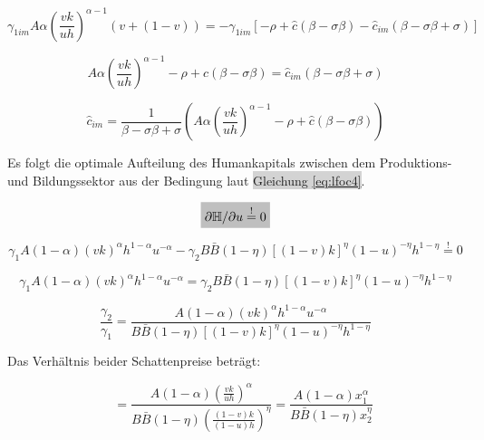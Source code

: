 	\begin{equation*}
		\gamma_{1im} A \alpha \left(\frac{vk}{uh}\right)^{\alpha -1} (v+(1-v)) = - \gamma_{1im} \left [ - \rho + \hat{c} (\beta - \sigma\beta) - \hat{c}_{im} (\beta-\sigma\beta+ \sigma) \right ]
	\end{equation*}


	\begin{equation*}
		A \alpha \left(\frac{vk}{uh}\right)^{\alpha -1} - \rho + \hat{c} (\beta - \sigma\beta) = \hat{c}_{im}(\beta-\sigma\beta+ \sigma)
	\end{equation*}


	\begin{equation}
		\boxed{\hat{c}_{im}=\frac{1}{\beta-\sigma\beta+ \sigma}\left(A\alpha \left(\frac{vk}{uh}\right)^{\alpha -1}-\rho+\hat{c}(\beta - \sigma\beta)\right)}\label{eq:lKRRim}
	\end{equation}


Es folgt die optimale Aufteilung des Humankapitals zwischen dem Produktions- und Bildungssektor aus der Bedingung laut \colorbox{lightgray}{Gleichung \eqref{eq:lfoc4}}.


	\begin{equation*}
		\colorbox{lightgray}{$\partial\mathbb{H}/\partial u\overset{!}{=}0$}
	\end{equation*}


	\begin{equation}
		\gamma_1A(1-\alpha)(vk)^{\alpha}h^{1-\alpha}u^{-\alpha}-\gamma_2B\bar{B}(1-\eta)[(1-v)k]^\eta (1-u)^{-\eta} h^{1-\eta}\overset{!}{=}0
	\end{equation}

	
	\begin{equation}
		\gamma_1A(1-\alpha)(vk)^{\alpha}h^{1-\alpha}u^{-\alpha}=\gamma_2B\bar{B}(1-\eta)[(1-v)k]^\eta (1-u)^{-\eta} h^{1-\eta}\label{foc4}
	\end{equation}


	\begin{equation}
		\frac{\gamma_2}{\gamma_1}=\frac{A(1-\alpha)(vk)^{\alpha}h^{1-\alpha}u^{-\alpha}}{B\bar{B}(1-\eta)[(1-v)k]^\eta (1-u)^{-\eta} h^{1-\eta}}
	\end{equation}


Das Verhältnis beider Schattenpreise beträgt: 


	\begin{equation}
		\quad~=\frac{A(1-\alpha)\left(\frac{vk}{uh}\right)^{\alpha}}{B\bar{B}(1-\eta)\left(\frac{(1-v)k}{(1-u)h}\right)^\eta}=\frac{A(1-\alpha)x_1^{\alpha}}{B\bar{B}(1-\eta)x_2^\eta}\label{Verhaltnisgleichung3}
	\end{equation}


